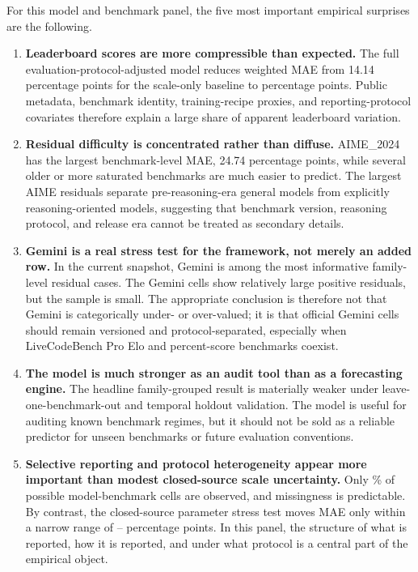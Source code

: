 \documentclass[11pt]{article}
\begin{document}
For this model and benchmark panel, the five most important empirical surprises are the following.
\begin{enumerate}[leftmargin=*]
\item \textbf{Leaderboard scores are more compressible than expected.} The full evaluation-protocol-adjusted model reduces weighted MAE from 14.14 percentage points for the scale-only baseline to \CanonicalMAE{} percentage points. Public metadata, benchmark identity, training-recipe proxies, and reporting-protocol covariates therefore explain a large share of apparent leaderboard variation.
\item \textbf{Residual difficulty is concentrated rather than diffuse.} AIME\_2024 has the largest benchmark-level MAE, \mbox{24.74} percentage points, while several older or more saturated benchmarks are much easier to predict. The largest AIME residuals separate pre-reasoning-era general models from explicitly reasoning-oriented models, suggesting that benchmark version, reasoning protocol, and release era cannot be treated as secondary details.
\item \textbf{Gemini is a real stress test for the framework, not merely an added row.} In the current snapshot, Gemini is among the most informative family-level residual cases. The Gemini cells show relatively large positive residuals, but the sample is small. The appropriate conclusion is therefore not that Gemini is categorically under- or over-valued; it is that official Gemini cells should remain versioned and protocol-separated, especially when LiveCodeBench Pro Elo and percent-score benchmarks coexist.
\item \textbf{The model is much stronger as an audit tool than as a forecasting engine.} The headline family-grouped result is materially weaker under leave-one-benchmark-out and temporal holdout validation. The model is useful for auditing known benchmark regimes, but it should not be sold as a reliable predictor for unseen benchmarks or future evaluation conventions.
\item \textbf{Selective reporting and protocol heterogeneity appear more important than modest closed-source scale uncertainty.} Only \CoveragePct{}\% of possible model-benchmark cells are observed, and missingness is predictable. By contrast, the closed-source parameter stress test moves MAE only within a narrow range of \StressMAELow{}--\StressMAEHigh{} percentage points. In this panel, the structure of what is reported, how it is reported, and under what protocol is a central part of the empirical object.
\end{enumerate}
\end{document}

